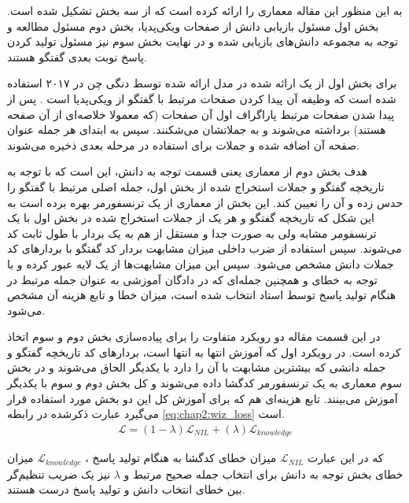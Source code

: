 به این منظور این مقاله معماری را ارائه کرده است که از سه بخش تشکیل شده است. بخش اول مسئول بازیابی دانش از صفحات ویکی‌پدیا، بخش دوم مسئول مطالعه و توجه به مجموعه دانش‌های بازیابی شده و در نهایت بخش سوم نیز مسئول تولید کردن پاسخ نوبت بعدی گفتگو هستند.

برای بخش اول از یک 
 ارائه شده در 
مدل ارائه شده توسط دنگی چن در ۲۰۱۷
استفاده شده است که وظیفه آن  پیدا کردن صفحات مرتبط با گفتگو از ویکی‌پدیا است
\cite{drqa_paper}
. پس از پیدا شدن صفحات مرتبط پاراگراف اول آن صفحات (که معمولا خلاصه‌ای از آن صفحه هستند) برداشته می‌شوند و به جملاتشان می‌‌شکنند. سپس به ابتدای هر جمله عنوان صفحه آن اضافه شده و جملات برای استفاده در مرحله بعدی ذخیره می‌شوند. 

هدف بخش دوم از معماری یعنی قسمت توجه به دانش، این است که با توجه به تاریخچه گفتگو و جملات استخراج شده از بخش اول، جمله اصلی مرتبط با گفتگو را حدس زده و آن را تعیین کند. این بخش از معماری از یک ترنسفورمر بهره برده است به این شکل که تاریخچه گفتگو و هر یک از جملات استخراج شده در بخش اول با یک ترنسفومر مشابه ولی به صورت جدا و مستقل از هم به یک بردار با طول ثابت کد می‌شوند. سپس استفاده از ضرب داخلی میزان مشابهت بردار کد  گفتگو با بردارهای کد جملات دانش مشخص می‌شود. سپس این میزان مشابهت‌ها از یک لایه 
عبور کرده و با توجه به خطای 
و همچنین جمله‌ای که در دادگان آموزشی به عنوان جمله مرتبط در هنگام تولید پاسخ توسط استاد انتخاب شده است، میزان خطا و تابع هزینه آن مشخص می‌شود.

 در این قسمت مقاله دو رویکرد متفاوت را برای پیاده‌سازی بخش دوم و سوم اتخاذ کرده است. در رویکرد اول که آموزش انتها به انتها است، بردار‌های کد  تاریخچه گفتگو و جمله دانشی که بیشترین مشابهت با آن را دارد با یکدیگر الحاق می‌شوند و در بخش سوم معماری به یک ترنسفورمر کدگشا داده می‌شوند و کل بخش دوم و سوم با یکدیگر آموزش می‌بینند.
تابع هزینه‌ای هم که برای آموزش کل این دو بخش مورد استفاده قرار می‌گیرد عبارت ذکر‌شده در رابطه
\ref{eq:chap2:wiz_loss}
 است.
\\
\begin{equation}
\label{eq:chap2:wiz_loss}
\begin{split}
\mathcal{L} = (1- \lambda ) \mathcal{L}_{NIL} + (\lambda) \mathcal{L}_{knowledge}
\end{split}\end{equation}

که در این عبارت
$\mathcal{L}_{NIL}$
میزان خطای کدگشا به هنگام تولید پاسخ
،
$\mathcal{L}_{knowledge}$
میزان خطای بخش توجه به دانش برای انتخاب جمله صحیح مرتبط
و
$\lambda$
نیز یک ضریب تنظیم‌گر بین خطای انتخاب دانش و تولید پاسخ درست هستند.

